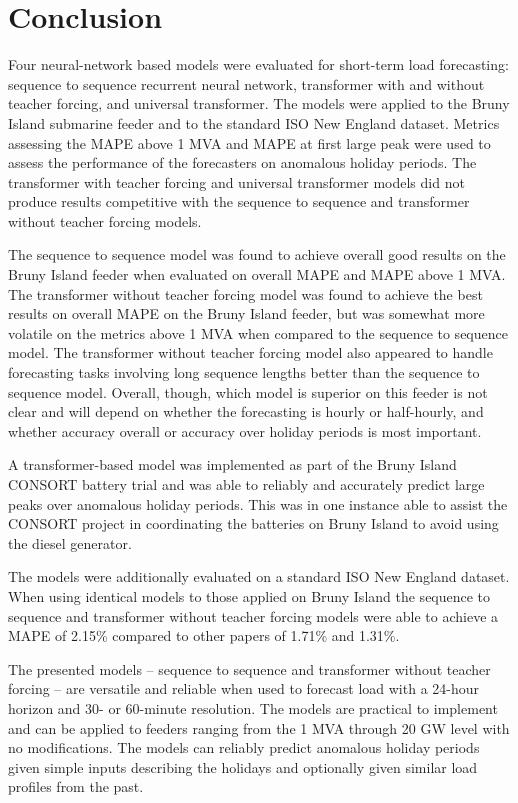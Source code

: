\chapter{Conclusion}
Four neural-network based models were evaluated for short-term load forecasting: sequence to sequence recurrent neural network, transformer with and without teacher forcing, and universal transformer.
The models were applied to the Bruny Island submarine feeder and to the standard ISO New England dataset.
Metrics assessing the MAPE above 1 MVA and MAPE at first large peak were used to assess the performance of the forecasters on anomalous holiday periods.
The transformer with teacher forcing and universal transformer models did not produce results competitive with the sequence to sequence and transformer without teacher forcing models.

The sequence to sequence model was found to achieve overall good results on the Bruny Island feeder when evaluated on overall MAPE and MAPE above 1 MVA.
The transformer without teacher forcing model was found to achieve the best results on overall MAPE on the Bruny Island feeder, but was somewhat more volatile on the metrics above 1 MVA when compared to the sequence to sequence model. 
The transformer without teacher forcing model also appeared to handle forecasting tasks involving long sequence lengths better than the sequence to sequence model. 
Overall, though, which model is superior on this feeder is not clear and will depend on whether the forecasting is hourly or half-hourly, and whether accuracy overall or accuracy over holiday periods is most important.

A transformer-based model was implemented as part of the Bruny Island CONSORT battery trial and was able to reliably and accurately predict large peaks over anomalous holiday periods.
This was in one instance able to assist the CONSORT project in coordinating the batteries on Bruny Island to avoid using the diesel generator.

The models were additionally evaluated on a standard ISO New England dataset.
When using identical models to those applied on Bruny Island the sequence to sequence and transformer without teacher forcing models were able to achieve a MAPE of 2.15\% compared to other papers of 1.71\% and 1.31\%.

The presented models -- sequence to sequence and transformer without teacher forcing -- are versatile and reliable when used to forecast load with a 24-hour horizon and 30- or 60-minute resolution.
The models are practical to implement and can be applied to feeders ranging from the 1 MVA through 20 GW level with no modifications.
The models can reliably predict anomalous holiday periods given simple inputs describing the holidays and optionally given similar load profiles from the past.


